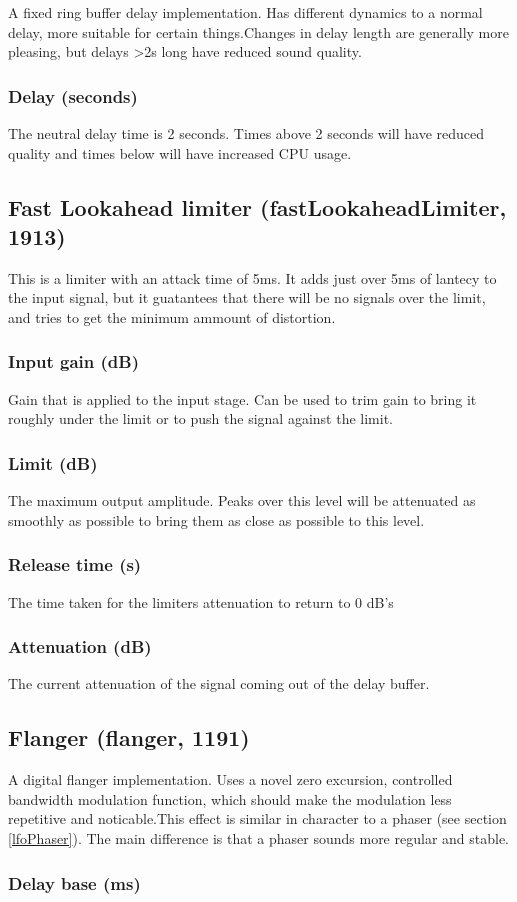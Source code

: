\documentclass[11pt]{article}
\begin{document}
A fixed ring buffer delay implementation. Has different dynamics to a normal delay, more suitable for certain things.Changes in delay length are generally more pleasing, but delays >2s long have reduced sound quality.\subsubsection*{Delay (seconds)}
The neutral delay time is 2 seconds. Times above 2 seconds will have reduced quality and times below will have increased CPU usage.\subsection{Fast Lookahead limiter (fastLookaheadLimiter, 1913)\label{fastLookaheadLimiter}\label{id1913}}
This is a limiter with an attack time of 5ms. It adds just over 5ms of
lantecy to the input signal, but it guatantees that there will be no signals
over the limit, and tries to get the minimum ammount of distortion.\subsubsection*{Input gain (dB)}
Gain that is applied to the input stage. Can be used to trim gain to
bring it roughly under the limit or to push the signal against the limit.\subsubsection*{Limit (dB)}
The maximum output amplitude. Peaks over this level will be attenuated
as smoothly as possible to bring them as close as possible to this level.\subsubsection*{Release time (s)}
The time taken for the limiters attenuation to return to 0 dB's\subsubsection*{Attenuation (dB)}
The current attenuation of the signal coming out of the delay buffer.\subsection{Flanger (flanger, 1191)\label{flanger}\label{id1191}}
A digital flanger implementation. Uses a novel zero excursion, controlled bandwidth modulation function, which should make the modulation less repetitive and noticable.This effect is similar in character to a phaser (see section \ref{lfoPhaser}). The main difference is that a phaser sounds more regular and stable.\subsubsection*{Delay base (ms)}
\end{document}
